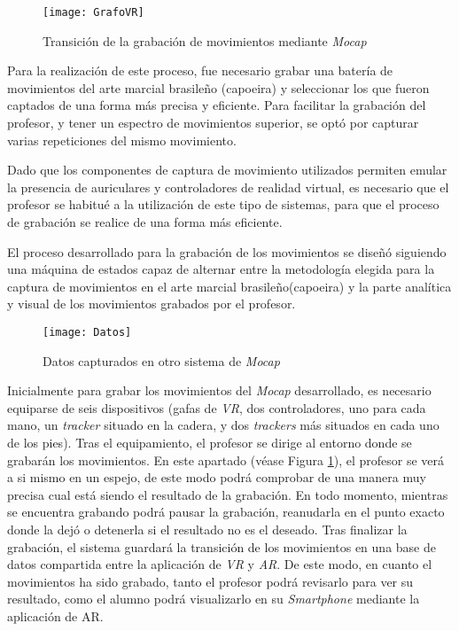 \begin{figure}[h!]
    \centering 
    \texttt{[image: GrafoVR]}
    \caption{Transición de la grabación de movimientos mediante \textit{Mocap}}
    \label{fig:GrafoVR}
\end{figure} 

Para la realización de este proceso, fue necesario grabar una batería de movimientos del arte marcial brasileño (capoeira) y seleccionar los que fueron captados de una forma más precisa y eficiente. Para facilitar la grabación del profesor, y tener un espectro de movimientos superior, se optó por capturar varias repeticiones del mismo movimiento. 

Dado que los componentes de captura de movimiento utilizados permiten emular la presencia de auriculares y controladores de realidad virtual, es necesario que el profesor se habitué a la utilización de este tipo de sistemas, para que el proceso de grabación se realice de una forma más eficiente.

El proceso desarrollado para la grabación de los movimientos se diseñó siguiendo una máquina de estados capaz de alternar entre la metodología elegida para la captura de movimientos en el arte marcial brasileño(capoeira) y la parte analítica y visual de los movimientos grabados por el profesor. 

\begin{figure}[h!]
    \centering 
    \texttt{[image: Datos]}
    \caption{Datos capturados en otro sistema de \textit{Mocap}}
    \label{fig:Datos}
\end{figure}

Inicialmente para grabar los movimientos del \textit{Mocap} desarrollado, es necesario equiparse de seis dispositivos (gafas de \textit{VR}, dos controladores, uno para cada mano, un \textit{tracker} situado en la cadera, y dos \textit{trackers} más situados en cada uno de los pies). Tras el equipamiento, el profesor se dirige al entorno donde se grabarán los movimientos. En este apartado (véase Figura \ref{fig:GrafoVR}), el profesor se verá a si mismo en un espejo, de este modo podrá comprobar de una manera muy precisa cual está siendo el resultado de la grabación. En todo momento, mientras se encuentra grabando podrá pausar la grabación, reanudarla en el punto exacto donde la dejó o detenerla si el resultado no es el deseado. Tras finalizar la grabación, el sistema guardará la transición de los movimientos en una base de datos compartida entre la aplicación de \textit{VR} y \textit{AR}. De este modo, en cuanto el movimientos ha sido grabado, tanto el profesor podrá revisarlo para ver su resultado, como el alumno podrá visualizarlo en su \textit{Smartphone} mediante la aplicación de AR.

